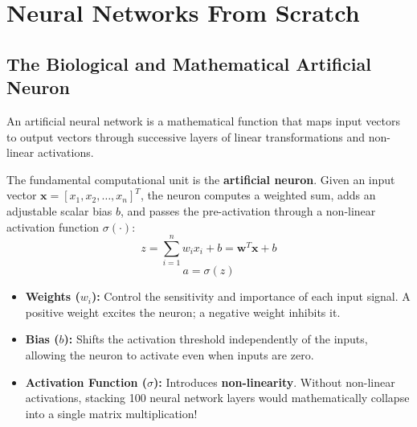 \chapter{Neural Networks From Scratch}
\label{chap:ch04}

\section{The Biological and Mathematical Artificial Neuron}
An artificial neural network is a mathematical function that maps input vectors to output vectors through successive layers of linear transformations and non-linear activations.

The fundamental computational unit is the \textbf{artificial neuron}. Given an input vector $\mathbf{x} = [x_1, x_2, \dots, x_n]^T$, the neuron computes a weighted sum, adds an adjustable scalar bias $b$, and passes the pre-activation through a non-linear activation function $\sigma(\cdot)$:
\begin{equation}
z = \sum_{i=1}^n w_i x_i + b = \mathbf{w}^T \mathbf{x} + b
\end{equation}
\begin{equation}
a = \sigma(z)
\end{equation}
\begin{itemize}
    \item \textbf{Weights ($w_i$):} Control the sensitivity and importance of each input signal. A positive weight excites the neuron; a negative weight inhibits it.
    \item \textbf{Bias ($b$):} Shifts the activation threshold independently of the inputs, allowing the neuron to activate even when inputs are zero.
    \item \textbf{Activation Function ($\sigma$):} Introduces \textbf{non-linearity}. Without non-linear activations, stacking 100 neural network layers would mathematically collapse into a single matrix multiplication!
\end{itemize}

